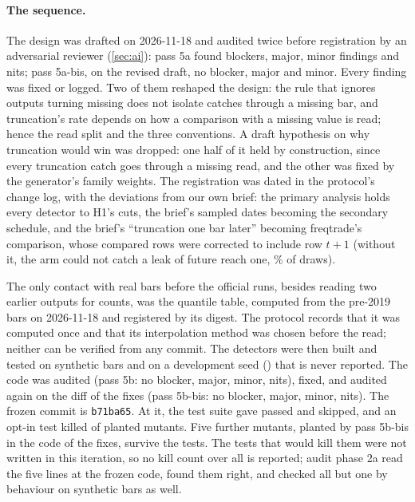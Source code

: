 \documentclass[11pt]{article}
\newcommand{\code}[1]{\texttt{#1}}
\newcommand{\pct}{\%}
\begin{document}
\paragraph{The sequence.} The design was drafted on 2026-11-18 and audited twice before
registration by an adversarial reviewer (\cref{sec:ai}): pass 5a found \NumAfiveaBlock{} blockers,
\NumAfiveaMajor{} major, \NumAfiveaMinor{} minor findings and \NumAfiveaNit{} nits; pass 5a-bis, on
the revised draft, no blocker, \NumAfiveabisMajor{} major and \NumAfiveabisMinor{} minor. Every
finding was fixed or logged. Two of them reshaped the design: the rule that ignores outputs turning
missing does not isolate catches through a missing bar, and truncation's rate depends on how a
comparison with a missing value is read; hence the read split and the three conventions. A draft
hypothesis on why truncation would win was dropped: one half of it held by construction, since every
truncation catch goes through a missing read, and the other was fixed by the generator's family
weights. The registration was dated in the protocol's change log, with the deviations from our own
brief: the primary analysis holds every detector to H1's cuts, the brief's sampled dates becoming
the secondary schedule, and the brief's ``truncation one bar later'' becoming freqtrade's comparison,
whose compared rows were corrected to include row $t+1$ (without it, the arm could not catch a leak
of future reach one, \NumReachOneShare\pct{} of draws).

The only contact with real bars before the official runs, besides reading two earlier outputs for
counts, was the quantile table, computed from the pre-2019 bars on 2026-11-18 and registered by its
digest. The protocol records that it was computed once and that its interpolation method was chosen
before the read; neither can be verified from any commit. The detectors were then built and tested on synthetic bars and on a development seed
(\NumDevSeed) that is never reported. The code was audited (pass 5b: no blocker, \NumAfivebMajor{}
major, \NumAfivebMinor{} minor, \NumAfivebNit{} nits), fixed, and audited again on the diff of the
fixes (pass 5b-bis: no blocker, \NumAfivebbisMajor{} major, \NumAfivebbisMinor{} minor,
\NumAfivebbisNit{} nits). The frozen commit is \code{b71ba65}. At it, the test suite gave
\NumSuitePassed{} passed and \NumSuiteSkipped{} skipped, and an opt-in test killed \NumMutKilled{} of
\NumMutTotal{} planted mutants. Five further mutants, planted by pass 5b-bis in the code of the fixes, survive the tests. The tests
that would kill them were not written in this iteration, so no kill count over all \NumMutLater{}
is reported; audit phase 2a read the five lines at the frozen code, found them right, and checked
all but one by behaviour on synthetic bars as well.
\end{document}
